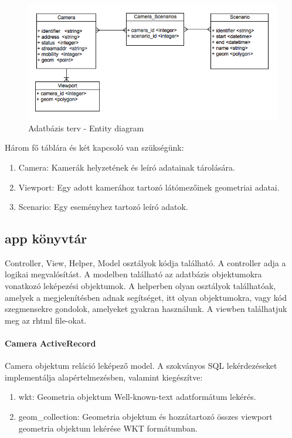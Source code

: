   \begin{figure}[h!]
    \centering
    \includegraphics[width=1.0\textwidth]{chapters/chap3/db.png}
    \caption{Adatbázis terv - Entity diagram}
  \end{figure}

  
  Három fő táblára és két kapcsoló van szükségünk:
  \begin{enumerate}
    \item Camera: Kamerák helyzetének és leíró adatainak tárolására.
    \item Viewport: Egy adott kamerához tartozó látómezőinek geometriai adatai.
    \item Scenario: Egy eseményhez tartozó leíró adatok.    
  \end{enumerate}
  

  


	\subsection{app könyvtár} %
	\label{sub:app_könyvtár}
	Controller, View, Helper, Model osztályok kódja található. A controller adja a logikai megvalósítást. A modelben található az
	adatbázis objektumokra vonatkozó leképezési objektumok. A helperben olyan osztályok találhatóak, amelyek a megjelenítésben adnak segítséget,
	itt olyan objektumokra, vagy kód szegmensekre gondolok, amelyeket gyakran használunk. A viewben találhatjuk meg az rhtml file-okat.
	
	\paragraph{Camera ActiveRecord}
	Camera objektum reláció leképező model. A szokványos SQL lekérdezéseket implementálja alapértelmezésben, valamint kiegészítve:
	\begin{enumerate}
	 \item wkt: Geometria objektum Well-known-text adatformátum lekérés.
	 \item geom\_collection: Geometria objektum és hozzátartozó összes viewport geometria objektum lekérése WKT formátumban.
	\end{enumerate}
	
